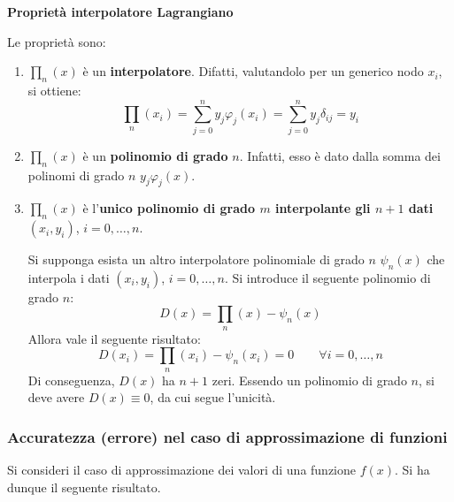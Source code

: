 \highspace
\begin{flushleft}
	\textcolor{Green3}{ \textbf{Proprietà interpolatore Lagrangiano}}
\end{flushleft}
Le proprietà sono:
\begin{enumerate}
	\item $\prod_{n}\left(x\right)$ è un \textbf{interpolatore}. Difatti, valutandolo per un generico nodo $x_{i}$, si ottiene:
	\begin{equation*}
		\displaystyle\prod_{n}\left(x_{i}\right) = \displaystyle\sum_{j=0}^{n} y_{j}\varphi_{j}\left(x_{i}\right) = \sum_{j=0}^{n} y_{j}\delta_{ij} = y_{i}
	\end{equation*}
	
	\item $\prod_{n}\left(x\right)$ è un \textbf{polinomio di grado} $n$. Infatti, esso è dato dalla somma dei polinomi di grado $n$ $y_{j}\varphi_{j}\left(x\right)$.
	
	\item $\prod_{n}\left(x\right)$ è l'\textbf{unico polinomio di grado $m$ interpolante gli $n+1$ dati} $\left(x_{i}, y_{i}\right)$, $i = 0, \dots, n$. 
	
	Si supponga esista un altro interpolatore polinomiale di grado $n$ $\psi_{n}\left(x\right)$ che interpola i dati $\left(x_{i}, y_{i}\right)$, $i = 0, \dots, n$. Si introduce il seguente polinomio di grado $n$:
	\begin{equation*}
		D\left(x\right) = \prod_{n}\left(x\right) - \psi_{n}\left(x\right)
	\end{equation*}
	Allora vale il seguente risultato:
	\begin{equation*}
		D\left(x_{i}\right) = \prod_{n}\left(x_{i}\right) - \psi_{n}\left(x_{i}\right) = 0 \hspace{2em} \forall i = 0, \dots, n
	\end{equation*}
	Di conseguenza, $D\left(x\right)$ ha $n+1$ zeri. Essendo un polinomio di grado $n$, si deve avere $D\left(x\right) \equiv 0$, da cui segue l'unicità.
\end{enumerate}

\newpage

\subsubsection{Accuratezza (errore) nel caso di approssimazione di funzioni}

Si consideri il caso di approssimazione dei valori di una funzione $f\left(x\right)$. Si ha dunque il seguente risultato.

